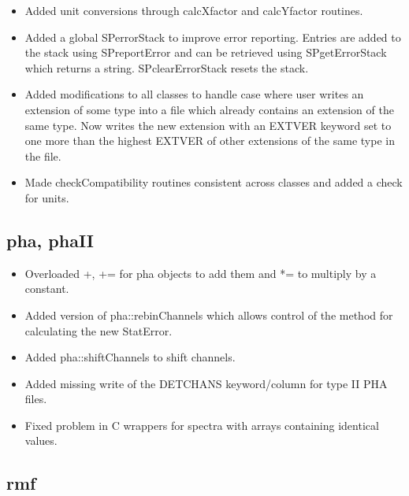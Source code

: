\documentclass[11pt]{book}
\begin{document}
\begin{itemize}

\item Added unit conversions through calcXfactor and calcYfactor
  routines.

\item Added a global SPerrorStack to improve error reporting. Entries
  are added to the stack using SPreportError and can be retrieved
  using SPgetErrorStack which returns a string. SPclearErrorStack
  resets the stack.

\item Added modifications to all classes to handle case where user
  writes an extension of some type into a file which already contains
  an extension of the same type. Now writes the new extension with an
  EXTVER keyword set to one more than the highest EXTVER of other
  extensions of the same type in the file.

\item Made checkCompatibility routines consistent across classes and
  added a check for units.

\end{itemize}

\subsection{pha, phaII}

\begin{itemize}

\item Overloaded +, += for pha objects to add them and *= to multiply
  by a constant.

\item Added version of pha::rebinChannels which allows control of the
  method for calculating the new StatError.

\item Added pha::shiftChannels to shift channels.

\item Added missing write of the DETCHANS keyword/column for type II
  PHA files.

\item Fixed problem in C wrappers for spectra with arrays containing
  identical values.

\end{itemize}

\subsection{rmf}
\end{document}
